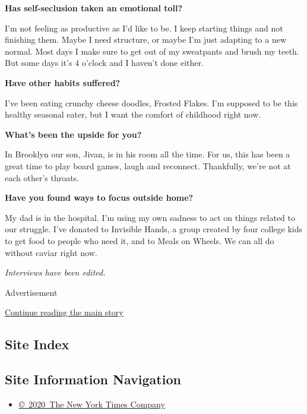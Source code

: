 \textbf{Has self-seclusion taken an emotional toll?}

I'm not feeling as productive as I'd like to be. I keep starting things
and not finishing them. Maybe I need structure, or maybe I'm just
adapting to a new normal. Most days I make sure to get out of my
sweatpants and brush my teeth. But some days it's 4 o'clock and I
haven't done either.

\textbf{Have other habits suffered?}

I've been eating crunchy cheese doodles, Frosted Flakes. I'm supposed to
be this healthy seasonal eater, but I want the comfort of childhood
right now.

\textbf{What's been the upside for you?}

In Brooklyn our son, Jivan, is in his room all the time. For us, this
has been a great time to play board games, laugh and reconnect.
Thankfully, we're not at each other's throats.

\textbf{Have you found ways to focus outside home?}

My dad is in the hospital. I'm using my own sadness to act on things
related to our struggle. I've donated to Invisible Hands, a group
created by four college kids to get food to people who need it, and to
Meals on Wheels. We can all do without caviar right now.

\emph{Interviews have been edited.}

Advertisement

\protect\hyperlink{after-bottom}{Continue reading the main story}

\hypertarget{site-index}{%
\subsection{Site Index}\label{site-index}}

\hypertarget{site-information-navigation}{%
\subsection{Site Information
Navigation}\label{site-information-navigation}}

\begin{itemize}
\tightlist
\item
  \href{https://help.nytimes3xbfgragh.onion/hc/en-us/articles/115014792127-Copyright-notice}{©~2020~The
  New York Times Company}
\end{itemize}

